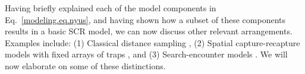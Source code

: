 
Having briefly explained each of the model components in
Eq.~\ref{modeling.eq.nyus}, and having
shown how a subset of these components results in a basic SCR model,
we can now discuss other relevant arrangements.
Examples include:
(1) Classical distance sampling \citep{buckland_etal:2001, borchers_etal:2002},
(2) Spatial capture-recapture models with fixed arrays of traps
    \citep{efford:2004, borchers_efford:2008, royle_etal:2009ecol,
           royle_etal:2009jae,
           gardner_etal:2010ecol,royle_etal:2011jwm}, and
(3) Search-encounter models \citep{royle_young:2008,
  royle_etal:2011mee}. We will now elaborate on some of these distinctions.
